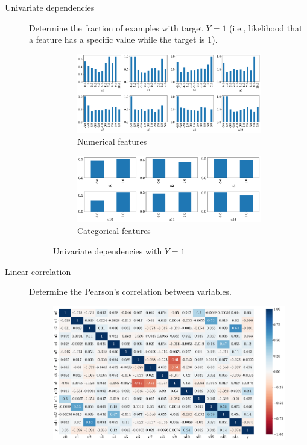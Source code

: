 \begin{description}
    \item[Univariate dependencies]
        Determine the fraction of examples with target $Y=1$ (i.e., likelihood that a feature has a specific value while the target is $1$).

        \begin{figure}[H]
            \centering
            \begin{subfigure}{0.75\linewidth}
                \centering
                \includegraphics[width=\linewidth]{./img/_biomed_target_num_distr.pdf}
                \caption{Numerical features}
            \end{subfigure}
            \begin{subfigure}{0.75\linewidth}
                \centering
                \includegraphics[width=\linewidth]{./img/_biomed_target_categ_distr.pdf}
                \caption{Categorical features}
            \end{subfigure}
            \caption{Univariate dependencies with $Y=1$}
        \end{figure}

    \item[Linear correlation]
        Determine the Pearson's correlation between variables.

        \begin{figure}[H]
            \centering
            \includegraphics[width=0.8\linewidth]{./img/_biomed_corr_matrix.pdf}
        \end{figure}
\end{description}




